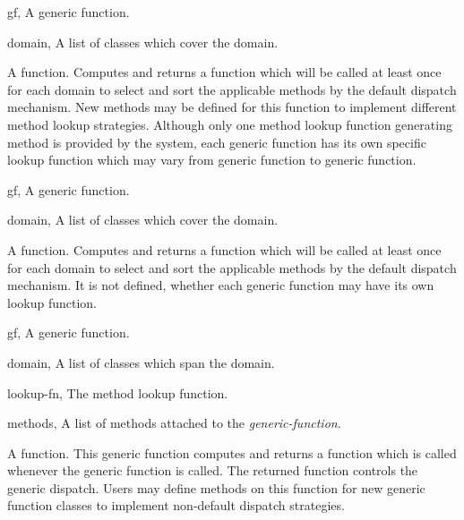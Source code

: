 %
\begin{optDefinition}
%
%
\begin{genericargs}
    \item[gf, \classref{generic-function}] A generic function.
    \item[domain, \classref{list}] A list of classes which cover the domain.
\end{genericargs}
%
\result%
A function.
%
\remarks%
Computes and returns a function which will be called at least once for
each domain to select and sort the applicable methods by the default
dispatch mechanism.  New methods may be defined for this function to
implement different method lookup strategies. Although only one method
lookup function generating method is provided by the system, each
generic function has its own specific lookup function which may vary
from generic function to generic function.

%
\begin{specargs}
    \item[gf, \classref{generic-function}] A generic function.
    \item[domain, \classref{list}] A list of classes which cover the domain.
\end{specargs}
%
\result%
A function.
%
\remarks%
Computes and returns a function which will be called at least once for
each domain to select and sort the applicable methods by the default
dispatch mechanism.  It is not defined, whether each generic function
may have its own lookup function.

%
\begin{genericargs}
    \item[gf, \classref{generic-function}] A generic function.
    \item[domain, \classref{list}] A list of classes which span the domain.
    \item[lookup-fn, \classref{function}] The method lookup function.
    \item[methods, \classref{list}] A list of methods attached to the {\em
        generic-function}.
\end{genericargs}
%
\result%
A function.
%
\remarks%
This generic function computes and returns a function which is called
whenever the generic function is called. The returned function
controls the generic dispatch.  Users may define methods on this
function for new generic function classes to implement non-default
dispatch strategies.


\end{optDefinition}
